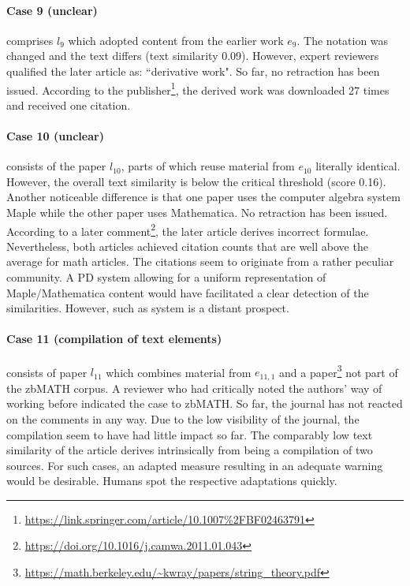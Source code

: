 \documentclass{llncs}
\begin{document}
\paragraph{Case 9 (unclear)} comprises $l_9$ which adopted content from the earlier work $e_9$. The notation was changed and the text differs (text similarity 0.09). However, expert reviewers qualified the later article as: ``derivative work". So far, no retraction has been issued. According to the publisher\footnote{\url{https://link.springer.com/article/10.1007\%2FBF02463791}}, the derived work was downloaded 27 times and received one citation.

\paragraph{Case 10 (unclear)} consists of the paper $l_{10}$, parts of which reuse material from $e_{10}$ literally identical. However, the overall text similarity is below the critical threshold (score 0.16). Another noticeable difference is that one paper
uses the computer algebra system Maple while the other paper uses Mathematica. No retraction has been issued. According to a later comment\footnote{\url{https://doi.org/10.1016/j.camwa.2011.01.043}}, the later article derives incorrect formulae. Nevertheless, both articles achieved citation counts that are well above the average for math articles. The citations seem to originate from a rather peculiar community.
A PD system allowing for a uniform representation of Maple/Mathematica content would have facilitated a clear detection of the similarities. However, such as system is a distant prospect.

\paragraph{Case 11 (compilation of text elements)} consists of paper $l_{11}$ which combines material from $e_{11,1}$ and a paper\footnote{\url{https://math.berkeley.edu/~kwray/papers/string_theory.pdf}} not part of the zbMATH corpus. A reviewer who had critically noted the authors' way of working before indicated the case to zbMATH. So far, the journal has not reacted on the comments in any way. Due to the low visibility of the journal, the compilation seem to have had little impact so far. The comparably low text similarity of the article derives intrinsically from being a compilation of two sources. For such cases, an adapted measure resulting in an adequate warning would be desirable. Humans spot the respective adaptations quickly.
\end{document}
